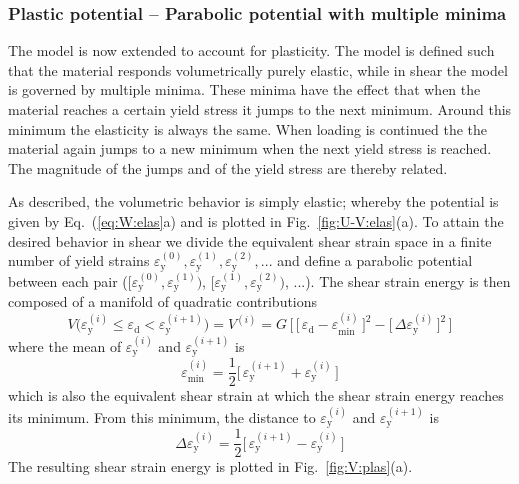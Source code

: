 \documentclass[times,namecite]{goose-article}
\begin{document}
\subsubsection{Plastic potential -- Parabolic potential with multiple minima}

The model is now extended to account for plasticity. The model is defined such that the material responds volumetrically purely elastic, while in shear the model is governed by multiple minima. These minima have the effect that when the material reaches a certain yield stress it jumps to the next minimum. Around this minimum the elasticity is always the same. When loading is continued the the material again jumps to a new minimum when the next yield stress is reached. The magnitude of the jumps and of the yield stress are thereby related.

As described, the volumetric behavior is simply elastic; whereby the potential is given by Eq.~(\ref{eq:W:elas}a) and is plotted in Fig.~\ref{fig:U-V:elas}(a). To attain the desired behavior in shear we divide the equivalent shear strain space in a finite number of yield strains $\varepsilon_\mathrm{y}^{(0)}, \varepsilon_\mathrm{y}^{(1)}, \varepsilon_\mathrm{y}^{(2)}, ...$ and define a parabolic potential between each pair ($[ \varepsilon_\mathrm{y}^{(0)}, \varepsilon_\mathrm{y}^{(1)} )$, $[ \varepsilon_\mathrm{y}^{(1)}, \varepsilon_\mathrm{y}^{(2)} )$, ...). The shear strain energy is then composed of a manifold of quadratic contributions
\begin{equation}\label{eq:V-plas}
  V \big(
    \varepsilon_\mathrm{y}^{(i)} \leq \varepsilon_\mathrm{d} < \varepsilon_\mathrm{y}^{(i+1)}
  \big)
  =
  V^{(i)}
  =
  G \, \bigg[\,
    \Big[\, \varepsilon_\mathrm{d} - \varepsilon_\mathrm{min}^{(i)} \,\Big]^2
    -
    \Big[\, \Delta \varepsilon_\mathrm{y}^{(i)} \,\Big]^2
  \,\bigg]
\end{equation}
where the mean of $\varepsilon_\mathrm{y}^{(i)}$ and $\varepsilon_\mathrm{y}^{(i+1)}$ is
\begin{equation}
  \varepsilon_\mathrm{min}^{(i)}
  =
  \frac{1}{2} \Big[\, \varepsilon_\mathrm{y}^{(i+1)} + \varepsilon_\mathrm{y}^{(i)} \,\Big]
\end{equation}
which is also the equivalent shear strain at which the shear strain energy reaches its minimum. From this minimum, the distance to $\varepsilon_\mathrm{y}^{(i)}$ and $\varepsilon_\mathrm{y}^{(i+1)}$ is
\begin{equation}
  \Delta \varepsilon_\mathrm{y}^{(i)}
  =
  \frac{1}{2} \Big[\, \varepsilon_\mathrm{y}^{(i+1)} - \varepsilon_\mathrm{y}^{(i)} \,\Big]
\end{equation}
The resulting shear strain energy is plotted in Fig.~\ref{fig:V:plas}(a).
\end{document}
